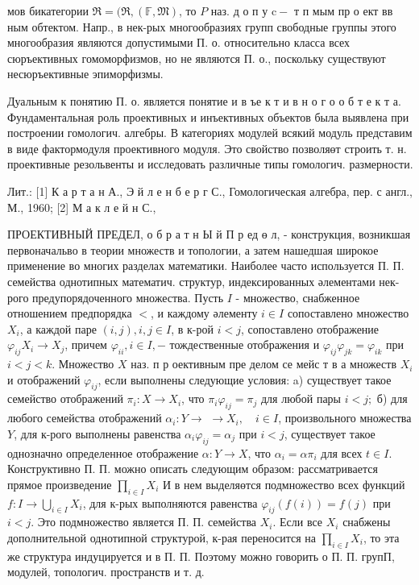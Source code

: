 \documentclass[10pt]{article}
\begin{document}
мов бикатегории $\mathfrak{\Re}=(\Re,(\mathbb{F}, \mathfrak{M})$, то $P$ наз. д о п у $\mathrm{c}-$ т п мым пр о ект вв ным обтектом. Напр., в нек-рых многообразиях групп свободные группы этого многообразия являются допустимыми П. о. относительно класса всех сюръективных гомоморфизмов, но не являются П. о., поскольку существуют несюръективные эпиморфизмы.



Дуальным к понятию П. о. является понятие и в ъе к т и в н о г о о б т е к т а. Фундаментальная роль проективных и инъективных объектов была выявлена при построении гомологич. алгебры. В категориях модулей всякий модуль представим в виде фактормодуля проективного модуля. Это свойство позволяөт строить т. н. проективные резольвенты и исследовать различные типы гомологич. размерности.



Лит.: [1] К а р т а н А., Э й л е н б е р г С., Гомологическая алгебра, пер. с англ., М., 1960; [2] М а к л е й н С.,



ПРОЕКТИВНЫЙ ПРЕДЕЛ, о б р а т н Ы й П р ед ө л, - конструкция, возникшая первоначальво в теории множеств и топологии, а затем нашедшая широкое применение во многих разделах математики. Наиболее часто используется П. П. семейства однотипных математич. структур, индексированных әлементами нек-рого предупорядоченного множества. Пусть $I$ - множество, снабженное отношением предпорядка $<$, и каждому әлементу $i \in I$ сопоставлено множество $X_{i}$, а каждой паре $(i, j), i, j \in I$, в к-рой $i<j$, сопоставлено отображение $\varphi_{i j} X_{i} \rightarrow X_{j}$, причем $\varphi_{i i}, i \in I,-$ тождественные отображения и $\varphi_{i j} \varphi_{j k}=\varphi_{i k}$ при $i<j<k$. Множество $X$ наз. п р оективным пре делом се мейс т в а множеств $X_{i}$ и отображений $\varphi_{i j}$, если выполнены следующие условия: a) существует такое семейство отображений $\pi_{i}: X \rightarrow X_{i}$, что $\pi_{i} \varphi_{i j}=\pi_{j}$ для любой пары $i<j ;$ б) для любого семейства отображений $\alpha_{i}: Y \rightarrow$ $\rightarrow X_{i}, \quad i \in I$, произвольного множества $Y$, для к-рого выполнены равенства $\alpha_{i} \varphi_{i j}=\alpha_{j}$ при $i<j$, существует такое однозначно определенное отображение $\alpha: Y \rightarrow X$, что $\alpha_{i}=\alpha \pi_{i}$ для всех $t \in I$. Конструктивно П. П. можно описать следующим образом: рассматривается прямое произведение $\prod_{i \in I} X_{i}$ И в нем выделяөтся подмножество всех функций $f: I \rightarrow \bigcup_{i \in I} X_{i}$, для к-рых выполняются равенства $\varphi_{i j}(f(i))=f(j)$ при $i<j$. Это подмножество является П. П. семейства $X_{i}$. Если все $X_{i}$ снабжены дополнительной однотипной структурой, к-рая переносится на $\prod_{i \in I} X_{i}$, то эта же структура индуцируется и в П. П. Поэтому можно говорить о П. П. групП, модулей, топологич. пространств и т. д.
\end{document}
